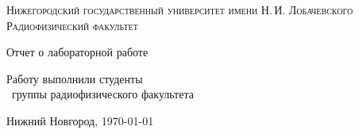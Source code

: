\begin{titlepage}
\begin{center}
{\small\textsc{Нижегородский государственный университет имени Н.\,И. Лобачевского}}
\vskip 2pt \vskip 3pt
{\small\textsc{Радиофизический факультет}}

\vfill


{{\large Отчет о лабораторной работе }\vskip 12pt {\LARGE \bfseries \labtheme}}

	
\vspace{2cm}
{\large Работу выполнили студенты \\[-0.25em] \labgroup\  группы радиофизического факультета \\[0.5em] {\Large \bfseries \labauthors}}



\end{center}

\vfill
	
	
	
\begin{center}
	{Нижний Новгород,  \today}
\end{center}

\end{titlepage}